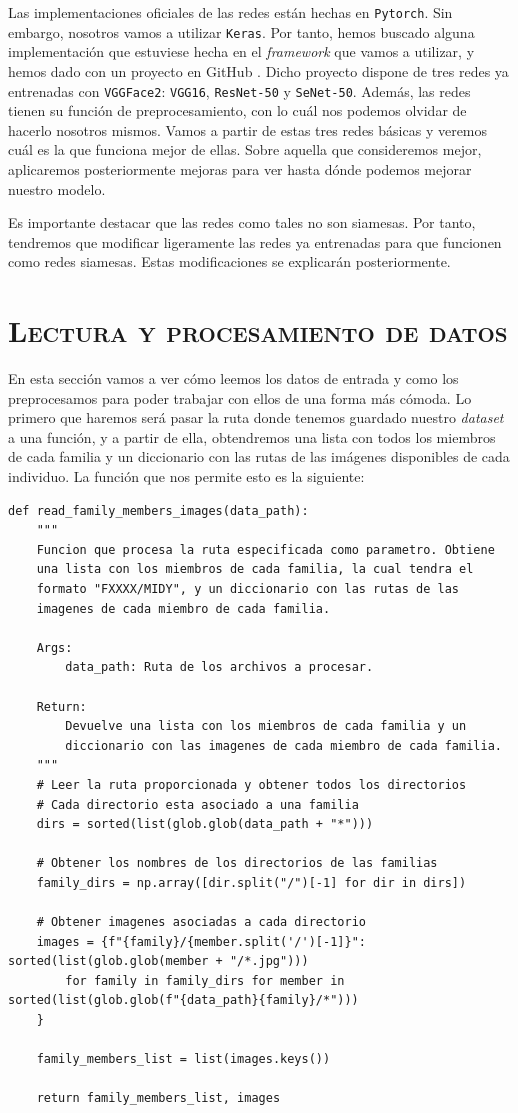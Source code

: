 \documentclass[11pt,a4paper]{article}
\begin{document}
Las implementaciones oficiales de las redes están hechas en \texttt{Pytorch}. Sin embargo, nosotros vamos a utilizar
\texttt{Keras}. Por tanto, hemos buscado alguna implementación que estuviese hecha en el \textit{framework}
que vamos a utilizar, y hemos dado con un proyecto en GitHub \cite{keras-vggface}. Dicho proyecto
dispone de tres redes ya entrenadas con \texttt{VGGFace2}: \texttt{VGG16}, \texttt{ResNet-50} y \texttt{SeNet-50}.
Además, las redes tienen su función de preprocesamiento, con lo cuál nos podemos olvidar de hacerlo nosotros
mismos. Vamos a partir de estas tres redes básicas y veremos cuál es la que funciona mejor de ellas. Sobre
aquella que consideremos mejor, aplicaremos posteriormente mejoras para ver hasta dónde podemos mejorar
nuestro modelo.

Es importante destacar que las redes como tales no son siamesas. Por tanto, tendremos que modificar ligeramente
las redes ya entrenadas para que funcionen como redes siamesas. Estas modificaciones se explicarán posteriormente.

\section{\textsc{Lectura y procesamiento de datos}}

En esta sección vamos a ver cómo leemos los datos de entrada y como los preprocesamos para poder trabajar con
ellos de una forma más cómoda. Lo primero que haremos será pasar la ruta donde tenemos guardado nuestro
\textit{dataset} a una función, y a partir de ella, obtendremos una lista con todos los miembros de cada familia
y un diccionario con las rutas de las imágenes disponibles de cada individuo. La función que nos permite esto
es la siguiente:

\begin{lstlisting}
def read_family_members_images(data_path):
    """
    Funcion que procesa la ruta especificada como parametro. Obtiene
    una lista con los miembros de cada familia, la cual tendra el
    formato "FXXXX/MIDY", y un diccionario con las rutas de las
    imagenes de cada miembro de cada familia.

    Args:
        data_path: Ruta de los archivos a procesar.
    
    Return:
        Devuelve una lista con los miembros de cada familia y un
        diccionario con las imagenes de cada miembro de cada familia.
    """
    # Leer la ruta proporcionada y obtener todos los directorios
    # Cada directorio esta asociado a una familia
    dirs = sorted(list(glob.glob(data_path + "*")))

    # Obtener los nombres de los directorios de las familias
    family_dirs = np.array([dir.split("/")[-1] for dir in dirs])

    # Obtener imagenes asociadas a cada directorio
    images = {f"{family}/{member.split('/')[-1]}": sorted(list(glob.glob(member + "/*.jpg")))
        for family in family_dirs for member in sorted(list(glob.glob(f"{data_path}{family}/*")))
    }
    
    family_members_list = list(images.keys())
    
    return family_members_list, images
\end{lstlisting}
\end{document}

